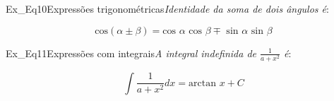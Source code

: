 
\begin{texercise}{Ex_Eq10}{Expressões trigonométricas}\textit{Identidade da soma de dois ângulos é}:\par\smallskip%
\begin{tcboutputlisting}
    \begin{center}
        \begin{equation*}
            \text{cos}(\alpha \pm \beta) = 
            \text{cos }\alpha \text{ cos }\beta \mp 
            \text{ sin }\alpha \text{ sin }\beta
        \end{equation*}
    \end{center}
\end{tcboutputlisting}
\tcbuselistingtext%
\end{texercise}

\begin{texercise}{Ex_Eq11}{Expressões com integrais}\textit{A integral indefinida de $\frac{1}{a+x^{2}}$ é}:\par\smallskip%
\begin{tcboutputlisting}
    \begin{center}
        \begin{equation*}
            \int \frac{1}{a+x^{2}}dx = \text{arctan } x + C
        \end{equation*}
    \end{center}
\end{tcboutputlisting}
\tcbuselistingtext%
\end{texercise}

